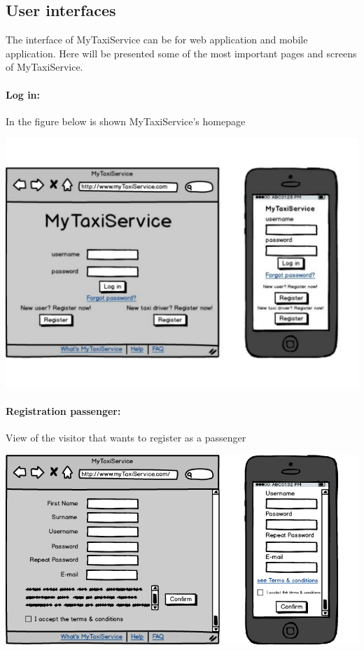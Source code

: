 \subsection{User interfaces}
The interface of MyTaxiService can be for web application and mobile application. Here will be presented some of the most important pages and screens of MyTaxiService.

\paragraph{Log in:}
	In the figure below is shown MyTaxiService's homepage
	\begin{center}
		\includegraphics[width=\textwidth]{mockup/login1.pdf}
	\end{center}
	
\paragraph{Registration passenger:}
	View of the visitor that wants to register as a passenger
\begin{center}
	\includegraphics[width=\textwidth]{mockup/registrationPassenger.png}
\end{center}



